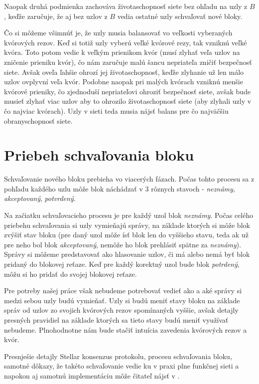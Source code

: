 Naopak druhá podmienka zachováva životaschopnosť siete bez ohľadu na uzly z $B$,
keďže zaručuje, že aj bez uzlov z $B$ vedia ostatné uzly schvaľovať nové bloky.

Čo si môžeme všimnúť je, že uzly musia balansovať vo veľkosti vyberaných kvórových
rezov. Keď si totiž uzly vyberú veľké kvórové rezy, tak vzniknú veľké kvóra.
Toto potom vedie k veľkým prienikom kvór (musí zlyhať veľa uzlov na
zničenie prieniku kvór), čo nám zaručuje malú šancu nepriateľa zničiť bezpečnosť
siete. Avšak oveľa ľahšie ohrozí jej životaschopnosť, keďže zlyhanie už len
málo uzlov ovplyvní veľa kvór. Podobne naopak pri malých kvórach vzniknú menšie
kvórové prieniky, čo zjednoduší nepriateľovi ohroziť bezpečnosť siete, avšak
bude musieť zlyhať viac uzlov aby to ohrozilo životaschopnosť siete
(aby zlyhali uzly v čo najviac kvórach).
Uzly v sieti teda musia nájsť balans pre čo najväčšiu obranyschopnosť siete.

\section {Priebeh schvaľovania bloku}

Schvaľovanie nového bloku prebieha vo viacerých fázach. Počas tohto procesu sa 
z pohľadu každého uzlu môže blok náchádzať v 3 rôznych stavoch -
\textit{neznámy}, \textit{akceptovaný}, \textit{potvrdený}.

Na začiatku schvaľovacieho procesu je pre každý uzol blok \textit{neznámy}.
Počas celého priebehu schvaľovania si uzly vymieňajú správy, na základe ktorých
si môže blok zvýšiť stav bloku (pre daný uzol môže ísť blok len do vyššieho
stavu, teda ak už pre neho bol blok \textit{akceptovaný}, nemôže ho blok
prehlásiť spätne za \textit{neznámy}).
Správy si môžeme predstavovať ako hlasovanie uzlov, či má alebo nemá byť
blok pridaný do blokovej reťaze.
Keď pre každý korektný uzol bude blok \textit{potrdený}, môžu si ho pridať
do svojej blokovej reťaze.

Pre potreby našej práce však nebudeme potrebovať vedieť ako a aké správy si medzi
sebou uzly budú vymieňať.
Uzly si budú meniť stavy bloku na základe správ od uzlov zo svojich kvórových rezov
spomínaných vyššie, avšak detajly presných pravidiel na základe ktorých sa tieto
stavy budú meniť využívať nebudeme. Plnohodnotne nám bude stačiť intuícia zavedenia
kvórových rezov a kvór.

Presnješie detajly Stellar konsenzus protokolu, procesu schvaľovania bloku,
samotné dôkazy, že takéto schvaľovanie vedie ku v praxi plne funkčnej sieti a
napokon aj samotnú implementáciu môže čitateľ nájsť v \cite{mazieres2015stellar}.
